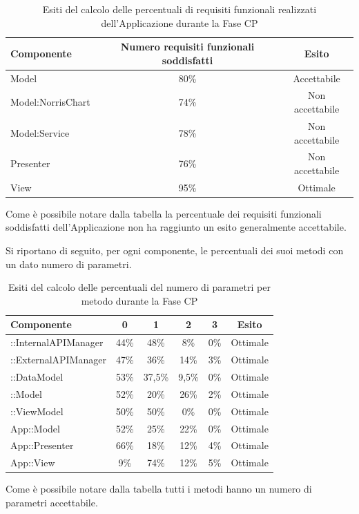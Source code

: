 \begin{table}[H]
	\centering
		\begin{tabu}{| l | c | c |}
			\hline
			Componente	& Numero requisiti funzionali soddisfatti	& Esito		\\ \hline \hline
			Model				&   80\% 	& Accettabile  \\ \hline
			Model:NorrisChart	&   74\% 	& Non accettabile  \\ \hline
			Model:Service 		& 	78\%	& Non accettabile   \\ \hline
			Presenter  			& 	76\%	& Non accettabile  \\ \hline
			View  				& 	95\%	& Ottimale  \\ \hline
		\end{tabu}
	\caption{Esiti del calcolo delle percentuali di requisiti funzionali realizzati dell'Applicazione durante la Fase CP}
\end{table}
Come è possibile notare dalla tabella la percentuale dei requisiti funzionali soddisfatti dell'Applicazione non ha raggiunto un esito generalmente accettabile.


Si riportano di seguito, per ogni componente, le percentuali dei suoi metodi con un dato numero di parametri.
\begin{table}[H]
	\centering
		\begin{tabu}{| l | c | c | c | c | c | }
			\hline
			Componente	& 0 & 1 & 2 & 3 & Esito		\\ \hline \hline
			::InternalAPIManager	& 44\% & 48\% & 8\% & 0\% & Ottimale  \\ \hline
			::ExternalAPIManager  & 	47\% & 36\% & 14\% & 3\%	& Ottimale  \\ \hline
			::DataModel  & 	53\%	&  37,5\% & 9,5\% & 0\% & Ottimale  \\ \hline
			::Model & 52\% & 20\% & 26\% & 2\% & Ottimale \\ \hline
			::ViewModel & 50\% & 50\% & 0\% & 0\% & Ottimale \\ \hline
			App::Model & 52\% & 25\% & 22\% & 0\% & Ottimale \\ \hline
			App::Presenter & 66\% & 18\% & 12\% & 4\% & Ottimale \\ \hline
			App::View & 9\% & 74\% & 12\% & 5\% & Ottimale \\ \hline
		\end{tabu}
	\caption{Esiti del calcolo delle percentuali del numero di parametri per metodo durante la Fase CP}
\end{table}
Come è possibile notare dalla tabella tutti i metodi hanno un numero di parametri accettabile. 
\\ \\

